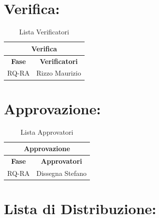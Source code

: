 \section*{\LARGE Verifica:}
\begin{table}[!h]
	\begin{center}
		\begin{tabular}
			{|c|c|}
			\hline
			\multicolumn{2}{|c|}{ \textbf{Verifica} } \\
			\hline
			\textbf{Fase} & \textbf{Verificatori} \\
			\hline
			RQ-RA & Rizzo Maurizio \\
			\hline

		\end{tabular}
		\caption{Lista Verificatori} %
		\label{tabverifica}
	\end{center}
\end{table}	
	
\section*{\LARGE Approvazione:}
\begin{table}[!h]
	\begin{center}
		\begin{tabular}
			{|c|c|}
			\hline
			\multicolumn{2}{|c|}{ \textbf{Approvazione} } \\
			\hline
			\textbf{Fase} & \textbf{Approvatori} \\
			\hline
			RQ-RA & Dissegna Stefano \\
			\hline

		\end{tabular}
		\caption{Lista Approvatori} %
		\label{tabapprovazione}
	\end{center}
\end{table}

\textbf{}
\section*{\LARGE Lista di Distribuzione:}


